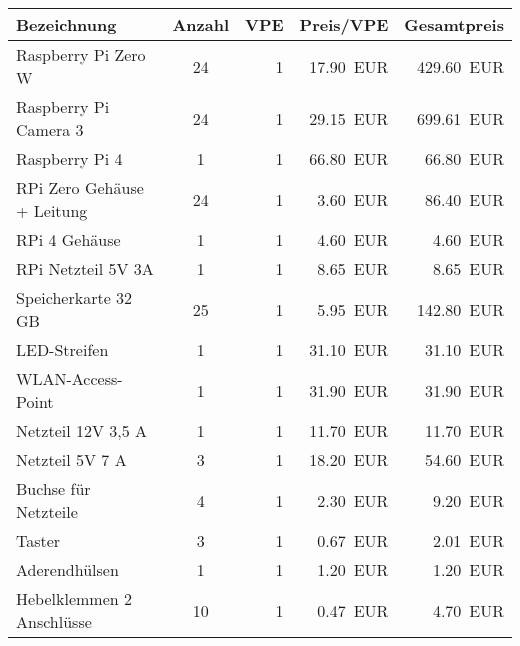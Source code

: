 \documentclass[./00PhotoBox.tex]{subfiles}
\begin{document}
\begin{table}[ht]
    \centering
    \begin{tabular}{l|c|r|r|r}
        Bezeichnung                            & Anzahl & \acrshort{VPE} & Preis/\acrshort{VPE} & Gesamtpreis       \\
        \hline
        Raspberry Pi Zero W                    & 24     & 1              & \SI{17,90}{EUR}      & \SI{429,60}{EUR}  \\
        Raspberry Pi Camera 3                  & 24     & 1              & \SI{29,15}{EUR}      & \SI{699,61}{EUR}  \\
        Raspberry Pi 4                         & 1      & 1              & \SI{66,80}{EUR}      & \SI{66,80}{EUR}   \\
        RPi Zero Gehäuse + Leitung             & 24     & 1              & \SI{3,60}{EUR}       & \SI{86,40}{EUR}   \\
        RPi 4 Gehäuse                          & 1      & 1              & \SI{4,60}{EUR}       & \SI{4,60}{EUR}    \\
        RPi  Netzteil 5V 3A                    & 1      & 1              & \SI{8,65}{EUR}       & \SI{8,65}{EUR}    \\
        Speicherkarte 32 GB                    & 25     & 1              & \SI{5,95}{EUR}       & \SI{142,80}{EUR}  \\
        LED-Streifen                           & 1      & 1              & \SI{31,10}{EUR}      & \SI{31,10}{EUR}   \\
        WLAN-Access-Point                      & 1      & 1              & \SI{31,90}{EUR}      & \SI{31,90}{EUR}   \\
        Netzteil 12V 3,5 A                     & 1      & 1              & \SI{11,70}{EUR}      & \SI{11,70}{EUR}   \\
        Netzteil 5V 7 A                        & 3      & 1              & \SI{18,20}{EUR}      & \SI{54,60}{EUR}   \\
        Buchse für Netzteile                   & 4      & 1              & \SI{2,30}{EUR}       & \SI{9,20}{EUR}    \\
        Taster                                 & 3      & 1              & \SI{0,67}{EUR}       & \SI{2,01}{EUR}    \\
        Aderendhülsen                          & 1      & 1              & \SI{1,20}{EUR}       & \SI{1,20}{EUR}    \\
        Hebelklemmen 2 Anschlüsse              & 10     & 1              & \SI{0,47}{EUR}       & \SI{4,70}{EUR}    \\

\end{tabular}
\end{table}
\end{document}

